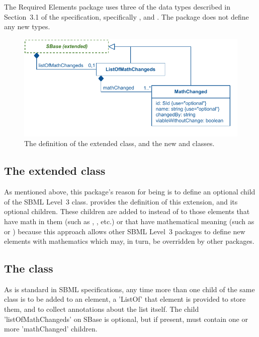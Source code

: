 The Required Elements package uses three of the data types described in Section~3.1 of the \sbmlthreecore specification, specifically ,  and .  The package does not define any new types.


\begin{figure}[bh]
  \includegraphics{figs/extended-sbase-req-uml}
  \vspace*{-2.5em}
  \caption{The definition of the extended \SBase class, and the new \ListOfMathChangeds and \MathChanged classes.}
  \label{extended-sbase-uml}
\end{figure}

\subsection{The extended  class}
\label{extended-sbase-class}

As mentioned above, this package's reason for being is to define an optional child of the SBML Level~3 \SBase class.   provides the definition of this \SBase extension, and its optional \MathChanged children.  These children are added to \SBase instead of to those elements that have math in them (such as \InitialAssignment, \KineticLaw, etc.) or that have mathematical meaning (such as \Parameter or \Species) because this approach allows other SBML Level~3 packages to define new elements with mathematics which may, in turn, be overridden by other packages.

\subsection{The  class}
\label{listofmathchangeds-class}

As is standard in SBML specifications, any time more than one child of the same class is to be added to an element, a 'ListOf' that element is provided to store them, and to collect annotations about the list itself.  The child 'listOfMathChangeds' on SBase is optional, but if present, must contain one or more 'mathChanged' children.

